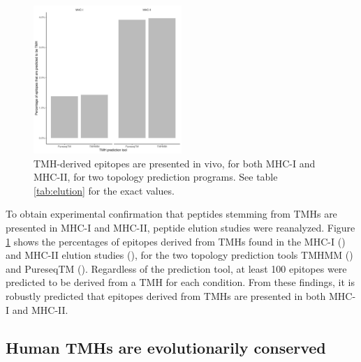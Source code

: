 \begin{figure}[!htbp]
  \centering
  \includegraphics[width=0.5\textwidth]{bbbq_article_issue_157/results.png}
  \caption{
    TMH-derived epitopes are presented in vivo,
    for both MHC-I and MHC-II, for two topology prediction
    programs.
    See table \ref{tab:elution} for the exact values.
  }
  \label{fig:elution}
\end{figure}

To obtain experimental confirmation that peptides stemming from TMHs are presented in MHC-I and MHC-II,
peptide elution studies were reanalyzed.
Figure \ref{fig:elution} shows the percentages of epitopes derived 
from TMHs
found in the MHC-I (\cite{schellens2015comprehensive}) and MHC-II elution 
studies  (\cite{bergseng2015different}),
for the two topology prediction tools TMHMM (\cite{krogh2001predicting}) and PureseqTM (\cite{wang2019efficient}). 
Regardless of the prediction tool, 
at least 100 epitopes were predicted to be derived from a TMH for each condition. 
From these findings, it is robustly predicted that
epitopes derived from TMHs are presented in both MHC-I and MHC-II.

\subsection{Human TMHs are evolutionarily conserved}

